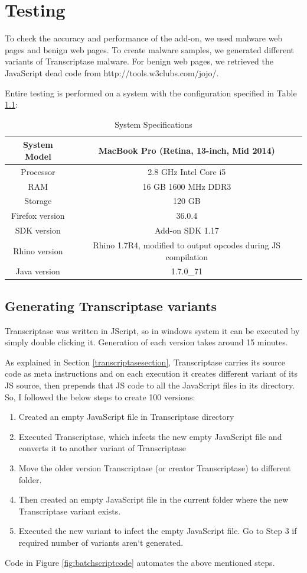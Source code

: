 \chapter{Testing}

To check the accuracy and performance of the add-on, we used malware web pages and benign web pages. To create malware samples, we generated different variants of Transcriptase malware. For benign web pages, we retrieved the JavaScript dead code from http://tools.w3clubs.com/jojo/.

Entire testing is performed on a system with the configuration specified in Table \ref{tab:title}:
\begin {table}[h]
\caption {System Specifications} \label{tab:title} 
  \begin{tabular}{|c|c|} 
\midrule
System Model & MacBook Pro (Retina, 13-inch, Mid 2014)\\
\midrule
Processor & 2.8 GHz Intel Core i5\\
\midrule
RAM & 16 GB 1600 MHz DDR3\\
\midrule
Storage & 120 GB\\
\midrule
Firefox version & 36.0.4\\
\midrule
SDK version & Add-on SDK 1.17\\
\midrule
Rhino version & Rhino 1.7R4, modified to output opcodes during JS compilation\\
\midrule
Java version & 1.7.0\_71\\
\midrule
\end{tabular}
 \end {table}

\section{Generating Transcriptase variants}

Transcriptase was written in JScript, so in windows system it can be executed by simply double clicking it. Generation of each version takes around 15 minutes. 

As explained in Section \ref{transcriptasesection}, Transcriptase carries its source code as meta instructions and on each execution it creates different variant of its JS source, then prepends that JS code to all the JavaScript files in its directory. So, I followed the below steps to create 100 versions:
\begin{enumerate}
\item Created an empty JavaScript file in Transcriptase directory
\item Executed Transcriptase, which infects the new empty JavaScript file and converts it to another variant of Transcriptase
\item Move the older version Transcriptase (or creator Transcriptase) to different folder.
\item Then created an empty JavaScript file in the current folder where the new Transcriptase variant exists.
\item Executed the new variant to infect the empty JavaScript file. Go to Step 3 if required number of variants aren`t generated. 
\end{enumerate}
Code in Figure \ref{fig:batchscriptcode} automates the above mentioned steps.

